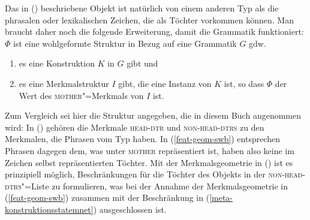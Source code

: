 \z
Das in () beschriebene Objekt ist natürlich von einem anderen Typ
als die phrasalen oder lexikalischen Zeichen, die als Töchter vorkommen können. Man braucht daher
noch die folgende Erweiterung, damit die Grammatik funktioniert:
\ea
\label{meta-konstruktionsstatemnet}
$\Phi$ ist eine wohlgeformte Struktur in Bezug auf eine Grammatik $G$ gdw.\
\begin{enumerate}
\item es eine Konstruktion $K$ in $G$ gibt und
\item es eine Merkmalstruktur $I$ gibt, die eine Instanz von $K$ ist, so dass
      $\Phi$ der Wert des \textsc{mother}"=Merkmals von $I$ ist.
\end{enumerate}
\z
Zum Vergleich sei hier die Struktur angegeben, die in diesem Buch angenommen wird:
\ea
{}
\z
In () gehören die Merkmale \textsc{head-dtr} und \textsc{non-head-dtrs} zu den Merkmalen, die
\zb Phrasen vom Typ \type{head"=complement"=phrase} haben. In (\ref{feat-geom-swb}) entsprechen
Phrasen dagegen dem, was unter \textsc{mother} repräsentiert ist, haben also keine im Zeichen selbst
repräsentierten Töchter. Mit der Merkmalsgeometrie in (\mex{0}) ist es prinzipiell möglich,
Beschränkungen für die Töchter des Objekts in der \textsc{non-head-dtrs}"=Liste zu formulieren, was bei
der Annahme der Merkmalsgeometrie in (\ref{feat-geom-swb}) zusammen mit der Beschränkung in
(\ref{meta-konstruktionsstatemnet}) ausgeschlossen ist. 

